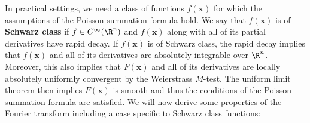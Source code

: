       In practical settings, we need a class of functions $f(\mathbf{x})$ for which the assumptions of the Poisson summation formula hold. We say that $f(\mathbf{x})$ is of \textbf{Schwarz class} if $f \in C^{\infty}(\R^{n})$ and $f(\mathbf{x})$ along with all of its partial derivatives have rapid decay. If $f(\mathbf{x})$ is of Schwarz class, the rapid decay implies that $f(\mathbf{x})$ and all of its derivatives are absolutely integrable over $\R^{n}$. Moreover, this also implies that $F(\mathbf{x})$ and all of its derivatives are locally absolutely uniformly convergent by the Weierstrass $M$-test. The uniform limit theorem then implies $F(\mathbf{x})$ is smooth and thus the conditions of the Poisson summation formula are satisfied. We will now derive some properties of the Fourier transform including a case specific to Schwarz class functions:

